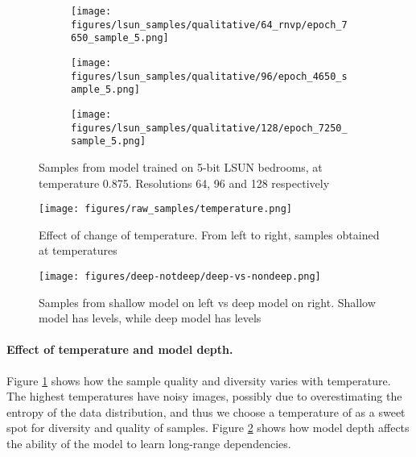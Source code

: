 \documentclass{article}
\begin{document}
\begin{figure}
	\centering
	\begin{subfigure}{0.32\textwidth}
    	\texttt{[image: figures/lsun\_samples/qualitative/64\_rnvp/epoch\_7650\_sample\_5.png]}
    \end{subfigure}\hspace{0.01\textwidth}\begin{subfigure}{0.32\textwidth}
    	\texttt{[image: figures/lsun\_samples/qualitative/96/epoch\_4650\_sample\_5.png]}
    \end{subfigure}\hspace{0.01\textwidth}\begin{subfigure}{0.32\textwidth}
    	\texttt{[image: figures/lsun\_samples/qualitative/128/epoch\_7250\_sample\_5.png]}
    \end{subfigure}\caption[Samples from model trained on 5-bit LSUN bedrooms, at temperature 0.875. Resolutions 64, 96 and 128 respectively]{Samples from model trained on 5-bit LSUN bedrooms, at temperature 0.875. Resolutions 64, 96 and 128 respectively \footnotemark}
\end{figure}

\begin{figure}
	\centering
	\texttt{[image: figures/raw\_samples/temperature.png]}
	\caption{Effect of change of temperature. From left to right, samples obtained at temperatures }
	\label{fig:temperature}
\end{figure}
\begin{figure}
	\centering
	\texttt{[image: figures/deep-notdeep/deep-vs-nondeep.png]}
	\caption{Samples from shallow model on left vs deep model on right. Shallow model has  levels, while deep model has  levels}
	\label{fig:depth}
\end{figure}


\paragraph{Effect of temperature and model depth.} Figure \ref{fig:temperature} shows how the sample quality and diversity varies with temperature. The highest temperatures have noisy images, possibly due to overestimating the entropy of the data distribution, and thus we choose a temperature of  as a sweet spot for diversity and quality of samples. Figure \ref{fig:depth} shows how model depth affects the ability of the model to learn long-range dependencies.
\end{document}
